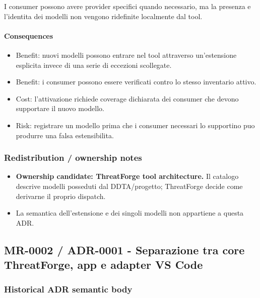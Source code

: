 \documentclass[
  10pt,
]{article}
\providecommand{\tightlist}{%
  \setlength{\itemsep}{0pt}\setlength{\parskip}{0pt}}
\begin{document}
I consumer possono avere provider specifici quando necessario, ma la
presenza e l'identita dei modelli non vengono ridefinite localmente dal
tool.

\paragraph{Consequences}\label{consequences-17}

\begin{itemize}
\tightlist
\item
  Benefit: nuovi modelli possono entrare nel tool attraverso
  un'estensione esplicita invece di una serie di eccezioni scollegate.
\item
  Benefit: i consumer possono essere verificati contro lo stesso
  inventario attivo.
\item
  Cost: l'attivazione richiede coverage dichiarata dei consumer che
  devono supportare il nuovo modello.
\item
  Risk: registrare un modello prima che i consumer necessari lo
  supportino puo produrre una falsa estensibilita.
\end{itemize}

\subsubsection{Redistribution / ownership
notes}\label{redistribution-ownership-notes-8}

\begin{itemize}
\tightlist
\item
  \textbf{Ownership candidate: ThreatForge tool architecture.} Il
  catalogo descrive modelli posseduti dal DDTA/progetto; ThreatForge
  decide come derivarne il proprio dispatch.
\item
  La semantica dell'estensione e dei singoli modelli non appartiene a
  questa ADR.
\end{itemize}

\subsection{MR-0002 / ADR-0001 - Separazione tra core ThreatForge, app e
adapter VS
Code}\label{mr-0002-adr-0001---separazione-tra-core-threatforge-app-e-adapter-vs-code}

\subsubsection{Historical ADR semantic
body}\label{historical-adr-semantic-body-9}
\end{document}
